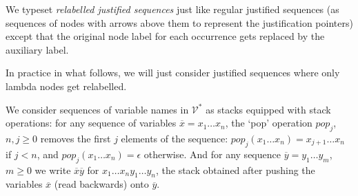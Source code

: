 \documentclass{article}
\theoremstyle{definition}
\newcommand\VarSet{\mathcal{V}}
\begin{document}
We typeset \emph{relabelled justified sequences} just like regular justified sequences (as sequences of nodes with arrows above them to represent the justification pointers) except that the original node label for each occurrence gets replaced by the auxiliary label.

In practice in what follows, we will just consider justified sequences where only lambda nodes get relabelled.

We consider sequences of variable names in $\VarSet^*$ as stacks equipped with stack operations:
for any sequence of variables $\overline{x} = x_1 \ldots x_n$, the `pop' operation $pop_j$, $n,j\geq0$ removes the first $j$ elements of the sequence: $pop_j (x_1 \ldots x_n) = x_{j+1} \ldots x_n$ if $j<n$, and $pop_j (x_1 \ldots x_n) = \epsilon$ otherwise. And for any sequence $\overline{y} = y_1 \ldots y_m$, $m\geq0$ we write $\overline{x}\overline{y}$ for
$x_1 \ldots x_n y_1 \ldots y_n$, the stack obtained after pushing the variables $\overline{x}$ (read backwards) onto $\overline{y}$.
\end{document}
